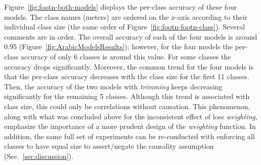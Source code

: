 \documentclass[journal,10pt,twocolumns,letter]{IEEEtran}
\begin{document}
Figure~\ref{fig:footn-both-models} displays the per-class accuracy of these four models. The class
names (meters) are ordered on the $x$-axis according to their individual class size (the same order
of Figure~\ref{fig:footn-footn-class}). Several comments are in order. The overall accuracy of each of
the four models is around 0.95 (Figure~\ref{fig:ArabicModelsResults}); however, for the four models
the per-class accuracy of only 6 classes is around this value. For some classes the accuracy drops
significantly. Moreover, the common trend for the four models is that the per-class accuracy
decreases with the class size for the first 11 classes. Then, the accuracy of the two models with
\textit{trimming} keeps decreasing significantly for the remaining 5 classes. Although this
trend is associated with class size, this could only be correlations without causation. This
phenomenon, along with what was concluded above for the inconsistent effect of loss
\textit{weighting}, emphasize the importance of a more prudent design of the \textit{weighting}
function. In addition, the same full set of experiments can be re-conducted with enforcing all
classes to have equal size to assert/negate the causality assumption (Sec.~\ref{sec:discussion}).

\bigskip
\end{document}
